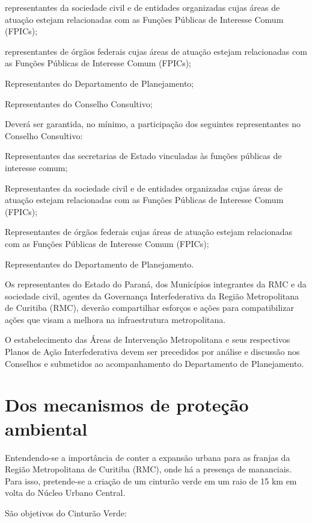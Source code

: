 \documentclass[capitulo]{br-lex-2017}
\begin{document}
	\inciso representantes da sociedade civil e de entidades organizadas cujas áreas de atuação estejam relacionadas com as Funções Públicas de Interesse Comum (FPICs);
	
	\inciso representantes de órgãos federais cujas áreas de atuação estejam relacionadas com as Funções Públicas de Interesse Comum (FPICs);
	
	\inciso Representantes do Departamento de Planejamento;
	
	\inciso Representantes do Conselho Consultivo;

\artigo Deverá ser garantida, no mínimo, a participação dos seguintes representantes no Conselho Consultivo:

	\inciso Representantes das secretarias de Estado vinculadas às funções públicas de interesse comum;
	
	\inciso Representantes da sociedade civil e de entidades organizadas cujas áreas de atuação estejam relacionadas com as Funções Públicas de Interesse Comum (FPICs);
	
	\inciso Representantes de órgãos federais cujas áreas de atuação estejam relacionadas com as Funções Públicas de Interesse Comum (FPICs);
	
	\inciso Representantes do Departamento de Planejamento.

\artigo Os representantes do Estado do Paraná, dos Municípios integrantes da RMC e da sociedade civil, agentes da Governança Interfederativa da Região Metropolitana de Curitiba (RMC), deverão compartilhar esforços e ações para compatibilizar ações que visam a melhora na infraestrutura metropolitana.

\artigo O estabelecimento das Áreas de Intervenção Metropolitana e seus respectivos Planos de Ação Interfederativa devem ser precedidos por análise e discussão nos Conselhos e  submetidos ao acompanhamento do Departamento de Planejamento.

\chapter{Dos mecanismos de proteção ambiental}

\artigo Entendendo-se a importância de conter a expansão urbana para as franjas da Região Metropolitana de Curitiba (RMC), onde há a presença de mananciais. Para isso, pretende-se a criação de um cinturão verde em um raio de 15 km em volta do Núcleo Urbano Central.

	\paragrafounico São objetivos do Cinturão Verde:
	
\end{document}
